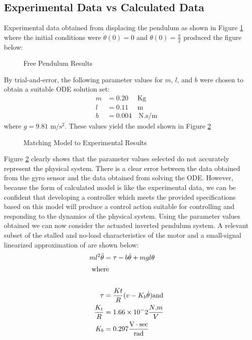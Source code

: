 \documentclass[11pt, a4paper,twocolumn]{article}
\begin{document}
\subsection{	Experimental Data vs Calculated Data	}

	Experimental data obtained from displacing the pendulum as shown in Figure \ref{fig:free_pend} where the initial conditions were $ \dot{\theta}(0) = 0 $ and $ \theta(0) = \frac{\pi}{2} $ produced the figure below:

\begin{figure}[h!]
\centering
\caption{Free Pendulum Results}
\label{fig:free_pend}
\end{figure}
By trial-and-error, the following parameter values for $m$, $l$, and $b$ were chosen to obtain a suitable ODE solution set:
\begin{align*}
	m &= 0.20\quad \text{ Kg}\\
	l &= 0.11\quad \text{ m}\\
	b &= 0.004\quad \text{N.s/m}
\end{align*}
where $ g = 9.81 \text{ m}/\text{s}^2 $. These values yield the model shown in Figure \ref{fig:damping_match}
\begin{figure}[hb!]
\centering
\caption{Matching Model to Experimental Results}
\label{fig:damping_match}
\end{figure}
	Figure \ref{fig:damping_match} clearly shows that the parameter values selected do not accurately represent the physical system. There is a clear error between the data obtained from the gyro sensor and the data obtained from solving the ODE. However, because the form of calculated model is like the experimental data, we can be confident that developing a controller which meets the provided specifications based on this model will produce a control action suitable for controlling and responding to the dynamics of the physical system.
Using the parameter values obtained we can now consider the actuated inverted pendulum system. A relevant subset of the stalled and no-load characteristics of the motor and a small-signal linearized approximation of are shown below:
%
\begin{align*}
	ml^2\ddot{\theta} &= \tau - b\dot{\theta} + mgl\theta \\
	\intertext{ where }	\\
	\tau &= \frac{Kt}{R}(v - K_b\dot{\theta}) \text{and}	\\
	\frac{K_t}{R} &= 1.66 \times 10^-2 \frac{N.m}{V}				\\
	K_b &= 0.297 \frac{\text{V}\cdot \text{sec}}{\text{rad}}\\
\end{align*}
\end{document}
